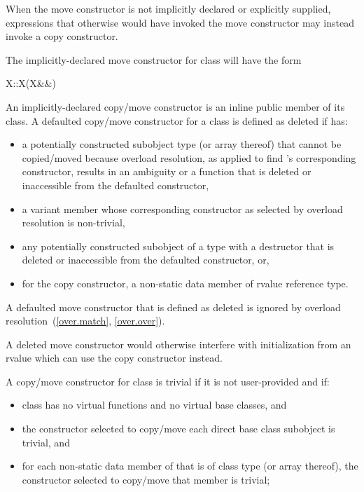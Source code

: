 \begin{note}
When the move constructor is not implicitly declared or explicitly supplied,
expressions that otherwise would have invoked the move constructor may instead invoke
a copy constructor.
\end{note}

\pnum
The implicitly-declared move constructor for class  will have the form
\begin{codeblock}
X::X(X&&)
\end{codeblock}

\pnum
An implicitly-declared copy/move constructor is an
inline public member of its class.
A defaulted copy/\brk{}move constructor for a class
   is defined as deleted if  has:
\begin{itemize}
\item a potentially constructed subobject type
   (or array thereof) that cannot be copied/moved because
  overload resolution, as applied to find
  's
  corresponding constructor, results in an ambiguity or
  a function that is deleted or inaccessible from the
  defaulted constructor,

\item a variant member whose corresponding constructor
  as selected by overload resolution is non-trivial,

\item any potentially constructed subobject of a type
  with a destructor that is deleted or inaccessible from the defaulted
  constructor, or,

\item for the copy constructor, a non-static data member of rvalue reference type.
\end{itemize}

A defaulted move constructor that is defined as deleted is ignored by overload
resolution~(\ref{over.match}, \ref{over.over}).
\begin{note}
A deleted move constructor would otherwise interfere with initialization from
an rvalue which can use the copy constructor instead.
\end{note}

\pnum
{}%
%
A copy/move constructor for class
is
trivial
if it is not user-provided and if:
\begin{itemize}
\item
class
has no virtual functions
and no virtual base classes, and

\item
the constructor selected to copy/move each direct base class subobject is trivial, and

\item
for each non-static data member of
that is of class type (or array thereof),
the constructor selected to copy/move that member is trivial;
\end{itemize}

